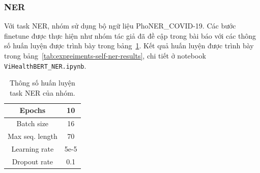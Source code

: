 \subsubsection{NER}
Với task NER, nhóm sử dụng bộ ngữ liệu PhoNER\_COVID-19. Các bước finetune được thực hiện như nhóm tác giả đã đề cập trong bài báo với các thông số huấn luyện được trình bày trong bảng~\ref{tab:experiments-self-ner}. Kết quả huấn luyện được trình bày trong bảng~\ref{tab:expreiments-self-ner-results}, chi tiết ở notebook \texttt{ViHealthBERT\_NER.ipynb}.

\begin{table}
\centering
\begin{tabular}{|c|c|}
\hline
Epochs & 10 \\ \hline
Batch size & 16 \\ \hline
Max seq. length & 70 \\ \hline
Learning rate & 5e-5 \\ \hline
Dropout rate & 0.1 \\ \hline
\end{tabular}
\caption{Thông số huấn luyện task NER của nhóm.}
\label{tab:experiments-self-ner}
\end{table}

